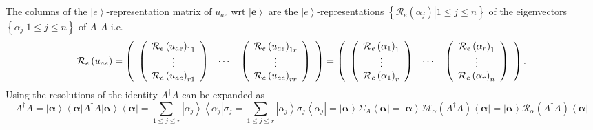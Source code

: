 \documentclass[aps,preprint]{revtex4}%
\begin{document}
The columns of the $\left\vert e\right\rangle $-representation matrix of
$u_{ae}$ wrt $\left\vert \mathbf{e}\right\rangle $ are the $\left\vert
e\right\rangle $-representations $\left\{  \left.  \mathcal{R}_{e}\left(
\alpha_{j}\right)  \right\vert 1\leq j\leq n\right\}  $ of the eigenvectors
$\left\{  \left.  \alpha_{j}\right\vert 1\leq j\leq n\right\}  $ of
$A^{\dagger}A$ i.e.
\begin{equation}
\mathcal{R}_{e}\left(  u_{ae}\right)  =\left(
\begin{array}
[c]{ccc}%
\left(
\begin{array}
[c]{c}%
\mathcal{R}_{e}\left(  u_{ae}\right)  _{11}\\
\vdots\\
\mathcal{R}_{e}\left(  u_{ae}\right)  _{r1}%
\end{array}
\right)  & \cdots & \left(
\begin{array}
[c]{c}%
\mathcal{R}_{e}\left(  u_{ae}\right)  _{1r}\\
\vdots\\
\mathcal{R}_{e}\left(  u_{ae}\right)  _{rr}%
\end{array}
\right)
\end{array}
\right)  =\left(
\begin{array}
[c]{ccc}%
\left(
\begin{array}
[c]{c}%
\mathcal{R}_{e}\left(  \alpha_{1}\right)  _{1}\\
\vdots\\
\mathcal{R}_{e}\left(  \alpha_{1}\right)  _{r}%
\end{array}
\right)  & \cdots & \left(
\begin{array}
[c]{c}%
\mathcal{R}_{e}\left(  \alpha_{r}\right)  _{1}\\
\vdots\\
\mathcal{R}_{e}\left(  \alpha_{r}\right)  _{n}%
\end{array}
\right)
\end{array}
\right)  .
\end{equation}
Using the resolutions of the identity $A^{\dagger}A$ can be expanded as
\begin{equation}
A^{\dagger}A=\left\vert \mathbf{\alpha}\right\rangle \left\langle
\mathbf{\alpha}\right\vert A^{\dagger}A\left\vert \mathbf{\alpha}\right\rangle
\left\langle \mathbf{\alpha}\right\vert =\sum_{1\leq j\leq r}\left\vert
\alpha_{j}\right\rangle \left\langle \alpha_{j}\right\vert \sigma_{j}%
=\sum_{1\leq j\leq r}\left\vert \alpha_{j}\right\rangle \sigma_{j}\left\langle
\alpha_{j}\right\vert =\left\vert \mathbf{\alpha}\right\rangle \Sigma
_{A}\left\langle \mathbf{\alpha}\right\vert =\left\vert \mathbf{\alpha
}\right\rangle \mathcal{M}_{\alpha}\left(  A^{\dagger}A\right)  \left\langle
\mathbf{\alpha}\right\vert =\left\vert \mathbf{\alpha}\right\rangle
\mathcal{R}_{\alpha}\left(  A^{\dagger}A\right)  \left\langle \mathbf{\alpha
}\right\vert
\end{equation}
\end{document}
